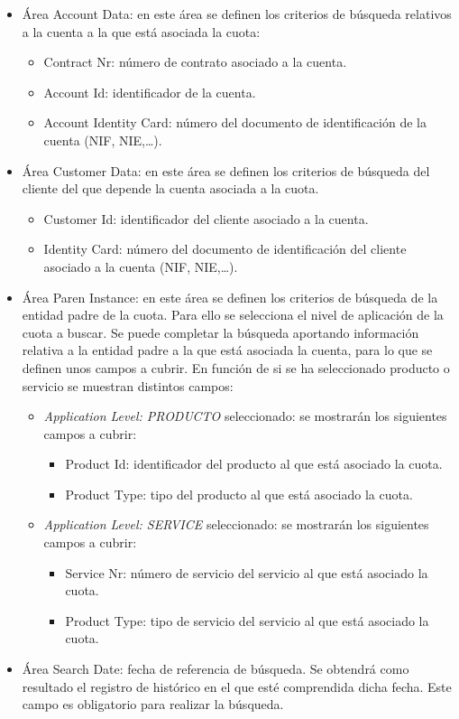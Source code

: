 \begin{itemize}
	\item Área Account Data: en este área se definen los criterios de búsqueda relativos a la cuenta a la que está asociada la cuota:
		\begin{itemize}
			\item Contract Nr: número de contrato asociado a la cuenta.
			\item Account Id: identificador de la cuenta.
			\item Account Identity Card: número del documento de identificación de la cuenta (NIF, NIE,\dots).
		\end{itemize}
	\item Área Customer Data: en este área se definen los criterios de búsqueda del cliente del que depende la cuenta asociada a la cuota.
		\begin{itemize}
			\item Customer Id: identificador del cliente asociado a la cuenta.
			\item Identity Card: número del documento de identificación del cliente asociado a la cuenta (NIF, NIE,\dots).
		\end{itemize}
	\item Área Paren Instance: en este área se definen los criterios de búsqueda de la entidad padre de la cuota. Para ello se selecciona el nivel de aplicación de la cuota a buscar. Se puede completar la búsqueda aportando información relativa a la entidad padre a la que está asociada la cuenta, para lo que se definen unos campos a cubrir. En función de si se ha seleccionado producto o servicio se muestran distintos campos:
	\begin{itemize}
 		\item \emph{Application Level: PRODUCTO} seleccionado: se mostrarán los siguientes campos a cubrir:
			\begin{itemize}
				\item Product Id: identificador del producto al que está asociado la cuota.
				\item Product Type: tipo del producto al que está asociado la cuota.
			\end{itemize}
		\item \emph{Application Level: SERVICE} seleccionado:  se mostrarán los siguientes campos a cubrir:
		\begin{itemize}
			\item Service Nr: número de servicio del servicio al que está asociado la cuota.
			\item Product Type: tipo de servicio del servicio al que está asociado la cuota.
		\end{itemize}
		
	\end{itemize}	    	
	\item Área Search Date: fecha de referencia de búsqueda. Se obtendrá como resultado el registro de histórico en el que esté comprendida dicha fecha. Este campo es obligatorio para realizar la búsqueda.
\end{itemize}

